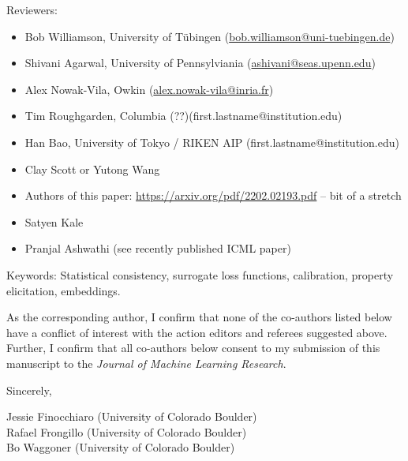 Reviewers:
\begin{itemize}
    \item Bob Williamson, University of T\"ubingen (\url{bob.williamson@uni-tuebingen.de})
    \item Shivani Agarwal, University of Pennsylviania (\url{ashivani@seas.upenn.edu})
    \item Alex Nowak-Vila, Owkin (\url{alex.nowak-vila@inria.fr})
    \item Tim Roughgarden, Columbia (??)(first.lastname@institution.edu)
    \item Han Bao, University of Tokyo / RIKEN AIP (first.lastname@institution.edu)
    \item Clay Scott or Yutong Wang
    \item Authors of this paper: \url{https://arxiv.org/pdf/2202.02193.pdf} -- bit of a stretch
    \item Satyen Kale
    \item Pranjal Ashwathi (see recently published ICML paper)
\end{itemize}

Keywords: Statistical consistency, surrogate loss functions, calibration, property elicitation, embeddings.

As the corresponding author, I confirm that none of the co-authors listed below have a conflict of interest with the action editors and referees suggested above. Further, I confirm that all co-authors below consent to my submission of this manuscript to the \emph{Journal of Machine Learning Research}.

\bigskip

Sincerely,

\medskip

Jessie Finocchiaro (University of Colorado Boulder)\\
Rafael Frongillo (University of Colorado Boulder)\\
Bo Waggoner (University of Colorado Boulder)








































